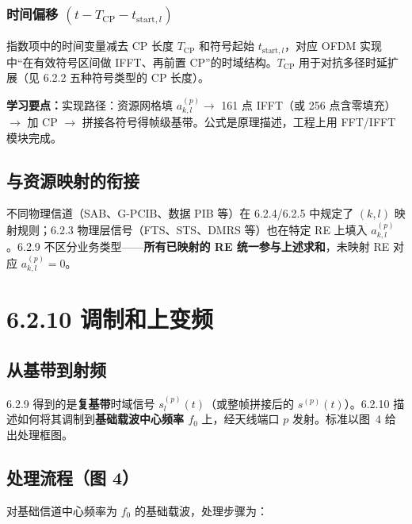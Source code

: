 \documentclass[11pt,a4paper]{ctexart}
\newcommand{\learn}[1]{\par\noindent\textcolor{blue!70!black}{\textbf{学习要点：}#1}\par}
\begin{document}
\subsubsection{时间偏移 $(t-T_{\mathrm{CP}}-t_{\mathrm{start},l})$}

指数项中的时间变量减去 CP 长度 $T_{\mathrm{CP}}$ 和符号起始 $t_{\mathrm{start},l}$，对应 OFDM 实现中“在有效符号区间做 IFFT、再前置 CP”的时域结构。$T_{\mathrm{CP}}$ 用于对抗多径时延扩展（见 6.2.2 五种符号类型的 CP 长度）。

\learn{实现路径：资源网格填 $a_{k,l}^{(p)}\rightarrow$ 161 点 IFFT（或 256 点含零填充）$\rightarrow$ 加 CP $\rightarrow$ 拼接各符号得帧级基带。公式是原理描述，工程上用 FFT/IFFT 模块完成。}

\subsection{与资源映射的衔接}

不同物理信道（SAB、G-PCIB、数据 PIB 等）在 6.2.4/6.2.5 中规定了 $(k,l)$ 映射规则；6.2.3 物理层信号（FTS、STS、DMRS 等）也在特定 RE 上填入 $a_{k,l}^{(p)}$。6.2.9 不区分业务类型——\textbf{所有已映射的 RE 统一参与上述求和}，未映射 RE 对应 $a_{k,l}^{(p)}=0$。

\newpage
\section{6.2.10 调制和上变频}

\subsection{从基带到射频}

6.2.9 得到的是\textbf{复基带}时域信号 $s_l^{(p)}(t)$（或整帧拼接后的 $s^{(p)}(t)$）。6.2.10 描述如何将其调制到\textbf{基础载波中心频率 $f_0$} 上，经天线端口 $p$ 发射。标准以图~4 给出处理框图。

\subsection{处理流程（图 4）}

对基础信道中心频率为 $f_0$ 的基础载波，处理步骤为：
\end{document}
